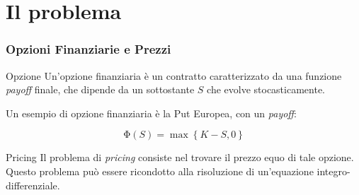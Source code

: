 \documentclass{beamer}
\begin{document}
\section{Il problema}


\begin{frame}
 \frametitle{Opzioni Finanziarie e Prezzi}
\begin{block}{Opzione}
Un'opzione finanziaria \`e un contratto caratterizzato da una funzione \emph{payoff} finale, che dipende da un sottostante $S$ che evolve stocasticamente.
\end{block}
\vspace{0.2cm}
Un esempio di opzione finanziaria \`e la Put Europea, con un \emph{payoff}:
 
 \[
  \mathrm{\Phi}(S)=\max\left\lbrace K-S,0\right\rbrace
 \]
 \pause

\begin{block}{Pricing}
Il problema di \emph{pricing} consiste nel trovare il prezzo equo di tale opzione. Questo problema pu\`o essere ricondotto alla risoluzione di un'equazione integro-differenziale.
\end{block}
 
\end{frame}



\end{document}
